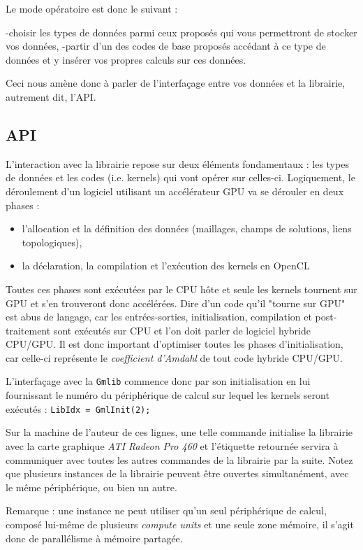 \documentclass[a4paper,12pt]{article}
\begin{document}
Le mode opératoire est donc le suivant :

-choisir les types de données parmi ceux proposés qui vous permettront de stocker vos données,
-partir d'un des codes de base proposés accédant à ce type de données et y insérer vos propres calculs sur ces données.

Ceci nous amène donc à parler de l'interfaçage entre vos données et la librairie, autrement dit, l'API.

\subsection{API}

L'interaction avec la librairie repose sur deux éléments fondamentaux : les types de données et les codes (i.e. kernels) qui vont opérer sur celles-ci.
Logiquement, le déroulement d'un logiciel utilisant un accélérateur GPU va se dérouler en deux phases :

\begin{itemize}
\item l'allocation et la définition des données (maillages, champs de solutions, liens topologiques),
\item la déclaration, la compilation et l'exécution des kernels en OpenCL
\end{itemize}

Toutes ces phases sont exécutées par le CPU hôte et seule les kernels tournent sur GPU et s'en trouveront donc accélérées.
Dire d'un code qu'il "tourne sur GPU" est abus de langage, car les entrées-sorties, initialisation, compilation et post-traitement sont exécutés sur CPU et l'on doit parler de logiciel hybride CPU/GPU.
Il est donc important d'optimiser toutes les phases d'initialisation, car celle-ci représente le \emph{coefficient d'Amdahl} de tout code hybride CPU/GPU.

L'interfaçage avec la {\tt Gmlib} commence donc par son initialisation en lui fournissant le numéro du périphérique de calcul sur lequel les kernels seront exécutés : {\tt LibIdx = GmlInit(2);}

Sur la machine de l'auteur de ces lignes, une telle commande initialise la librairie avec la carte graphique \emph{ATI Radeon Pro 460} et l'étiquette retournée servira à communiquer avec toutes les autres commandes de la librairie par la suite.
Notez que plusieurs instances de la librairie peuvent être ouvertes simultanément, avec le même périphérique, ou bien un autre.

Remarque : une instance ne peut utiliser qu'un seul périphérique de calcul, composé lui-même de plusieurs \emph{compute units} et une seule zone mémoire, il s'agit donc de parallélisme à mémoire partagée.
\end{document}
